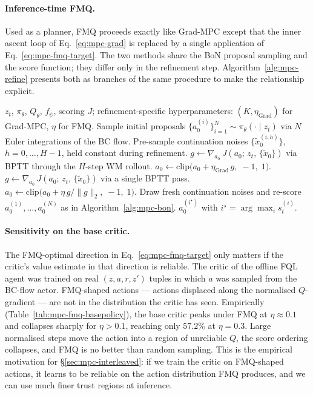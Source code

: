 \paragraph{Inference-time FMQ.} Used as a planner, FMQ proceeds exactly like Grad-MPC except that the inner ascent loop of Eq.~\eqref{eq:mpc-grad} is replaced by a single application of Eq.~\eqref{eq:mpc-fmq-target}. The two methods share the BoN proposal sampling and the score function; they differ only in the refinement step. Algorithm~\ref{alg:mpc-refine} presents both as branches of the same procedure to make the relationship explicit.

\begin{algorithm}[t]
\caption{Gradient-refined MPC inference. Grad-MPC ($K$ raw steps) and FMQ (one normalised step) share the proposal-and-score machinery and differ only in the inner refinement.}
\label{alg:mpc-refine}
\begin{algorithmic}[1]
\Require $z_t$, $\pi_\theta$, $Q_\theta$, $f_\psi$, scoring $J$; refinement-specific hyperparameters: $(K, \eta_{\text{Grad}})$ for Grad-MPC, $\eta$ for FMQ.
\State Sample initial proposals $\{a_0^{(i)}\}_{i=1}^N \sim \pi_\theta(\cdot \mid z_t)$ via $N$ Euler integrations of the BC flow.
\State Pre-sample continuation noises $\{\tilde x_0^{(i, h)}\}$, $h = 0, \dots, H-1$, held constant during refinement.
        \State $g \leftarrow \nabla_{a_0}\, J(a_0;\,z_t,\,\{\tilde x_0\})$ via BPTT through the $H$-step WM rollout.
        \State $a_0 \leftarrow \mathrm{clip}\big(a_0 + \eta_{\text{Grad}}\, g,\;-1,\;1\big)$.
    \EndFor
{}
    \State $g \leftarrow \nabla_{a_0}\, J(a_0;\,z_t,\,\{\tilde x_0\})$ via a single BPTT pass.
    \State $a_0 \leftarrow \mathrm{clip}\big(a_0 + \eta\, g / \|g\|_2,\;-1,\;1\big)$.
\EndIf
\State Draw fresh continuation noises and re-score $a_0^{(1)}, \dots, a_0^{(N)}$ as in Algorithm~\ref{alg:mpc-bon}.
\State \Return $a_0^{(i^\star)}$ with $i^\star = \arg\max_i s_t^{(i)}$.
\end{algorithmic}
\end{algorithm}

\paragraph{Sensitivity on the base critic.} The FMQ-optimal direction in Eq.~\eqref{eq:mpc-fmq-target} only matters if the critic's value estimate in that direction is reliable. The critic of the offline FQL agent was trained on real $(z, a, r, z')$ tuples in which $a$ was sampled from the BC-flow actor. FMQ-shaped actions --- actions displaced along the normalised $Q$-gradient --- are not in the distribution the critic has seen. Empirically (Table~\ref{tab:mpc-fmq-basepolicy}), the base critic peaks under FMQ at $\eta \approx 0.1$ and collapses sharply for $\eta > 0.1$, reaching only $57.2\%$ at $\eta = 0.3$. Large normalised steps move the action into a region of unreliable $Q$, the score ordering collapses, and FMQ is no better than random sampling. This is the empirical motivation for \S\ref{sec:mpc-interleaved}: if we train the critic on FMQ-shaped actions, it learns to be reliable on the action distribution FMQ produces, and we can use much finer trust regions at inference.

